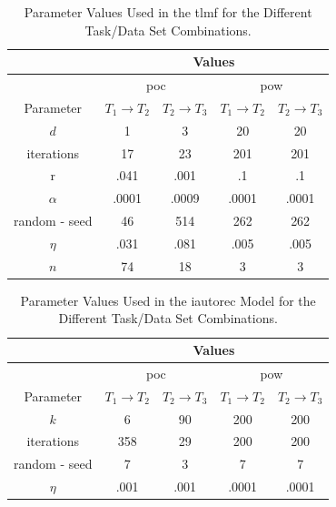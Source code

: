 \begin{table}[h!]
    \centering
    \begin{tabular}{|c|c|c|c|c|}
        \hline
         & \multicolumn{4}{|c|}{Values} \\
        \hline & \multicolumn{2}{|c|}{\acrshort{poc}} & \multicolumn{2}{|c|}{\acrshort{pow}} \\
        \hline Parameter & $T_1 \to T_2$  & $T_2 \to T_3$  & $T_1 \to T_2$  & $T_2 \to T_3$ \\
        \hline  $d$ & 1 & 3 & 20 & 20\\
          iterations & 17 & 23 & 201 & 201\\
          r & .041 & .001 & .1 & .1\\
          $\alpha$ & .0001 & .0009 & .0001 & .0001\\
          random - seed & 46 & 514 & 262 & 262\\
          $\eta$ & .031 & .081 & .005 & .005\\
          $n$ & 74 & 18 & 3 & 3\\
        \hline
    \end{tabular}
    \caption{Parameter Values Used in the \acrshort{tlmf} for the Different Task/Data Set Combinations.}
    \label{tab:tlmf}
\end{table}

\begin{table}[h!]
    \centering
    \begin{tabular}{|c|c|c|c|c|}
        \hline
         & \multicolumn{4}{|c|}{Values} \\
        \hline & \multicolumn{2}{|c|}{\acrshort{poc}} & \multicolumn{2}{|c|}{\acrshort{pow}} \\
        \hline Parameter & $T_1 \to T_2$  & $T_2 \to T_3$  & $T_1 \to T_2$  & $T_2 \to T_3$ \\
        \hline  $k$ & 6 & 90 & 200 & 200\\
          iterations & 358 & 29 & 200 & 200\\
          random - seed & 7 & 3 & 7 & 7\\
          $\eta$ & .001 & .001 & .0001 & .0001\\
        \hline
    \end{tabular}
    \caption{Parameter Values Used in the \acrshort{iautorec} Model for the Different Task/Data Set Combinations.}
    \label{tab:autorec}
\end{table}

